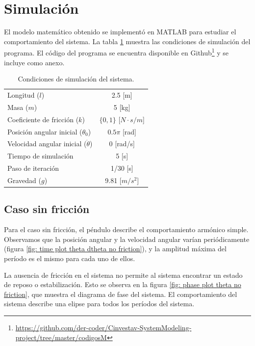 \section{Simulación}

El modelo matemático obtenido se implementó en MATLAB 
para estudiar el comportamiento del sistema.
La tabla \ref{table: simulation conditions}
muestra las condiciones de simulación del programa.
El código del programa se encuentra disponible en 
Github\footnote{\url{https://github.com/der-coder/Cinvestav-SystemModeling-project/tree/master/codigosM}}
y se incluye como anexo.

\begin{table}[hb]
 \begin{center}
\begin{tabular}{lc}
\hline
Longitud ($l$) & 2.5 [m] \\
Masa ($m$) & 5 [kg]\\
Coeficiente de fricción ($k$) & $\{0,1\}$ [$N \cdot s / m$] \\
Posición angular inicial ($\theta_0$) & $0.5\pi$ [rad] \\
Velocidad angular inicial ($\dot{\theta}$) & 0 [rad/s] \\
Tiempo de simulación & 5 [s]  \\
Paso de iteración & 1/30 [s] \\
Gravedad ($g$) & 9.81 [$m/s^2$]  \\
\hline
 \end{tabular}
 \end{center}
 \caption{Condiciones de simulación del sistema.}
\label{table: simulation conditions}
\end{table}

\subsection{Caso sin fricción}

Para el caso sin fricción, el péndulo describe 
el comportamiento armónico simple. 
Observamos que la posición angular y la velocidad angular
varían periódicamente (figura \ref{fig: time plot theta dtheta no friction}), y la amplitud máxima
del período es el mismo para cada uno de ellos.

La ausencia de fricción en el sistema no permite al sistema
encontrar un estado de reposo o estabilización. 
Esto se observa en la figura \ref{fig: phase plot theta no friction}, que
muestra el diagrama de fase del sistema.
El comportamiento del sistema describe una elipse para todos los períodos del sistema.


